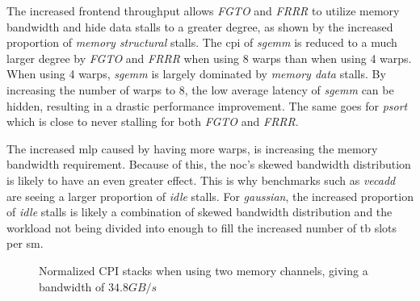 The increased frontend throughput allows \textit{FGTO} and \textit{FRRR} to utilize memory bandwidth and hide data stalls to a greater degree, as shown by the increased proportion of \textit{memory structural} stalls. The \acrshort{cpi} of \textit{sgemm} is reduced to a much larger degree by \textit{FGTO} and \textit{FRRR} when using 8 warps than when using 4 warps. When using 4 warps, \textit{sgemm} is largely dominated by \textit{memory data} stalls. By increasing the number of warps to 8, the low average latency of \textit{sgemm} can be hidden, resulting in a drastic performance improvement. The same goes for \textit{psort} which is close to never stalling for both \textit{FGTO} and \textit{FRRR}.

The increased \acrshort{mlp} caused by having more warps, is increasing the memory bandwidth requirement. Because of this, the \acrshort{noc}'s skewed bandwidth distribution is likely to have an even greater effect. This is why benchmarks such as \textit{vecadd} are seeing a larger proportion of \textit{idle} stalls. For \textit{gaussian}, the increased proportion of \textit{idle} stalls is likely a combination of skewed bandwidth distribution and the workload not being divided into enough  to fill the increased number of \acrshort{tb} slots per \acrshort{sm}.   

\begin{figure}
    \centering
    \caption[Normalized \acrshort{cpi} stacks with double the available memory bandwidth]{Normalized CPI stacks when using two memory channels, giving a bandwidth of $34.8GB/s$}
    \label{fig:2channel_memory}
\end{figure}

